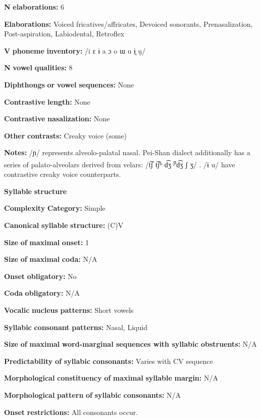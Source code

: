 \textbf{N} \textbf{elaborations:} 6

\textbf{Elaborations:} Voiced fricatives/affricates, Devoiced sonorants, Prenasalization, Post-aspiration, Labiodental, Retroflex

\textbf{V} \textbf{phoneme} \textbf{inventory:} /i ɛ ɨ a ɔ o ɯ u ɨ̰ ṵ/

\textbf{N} \textbf{vowel} \textbf{qualities:} 8

\textbf{Diphthongs} \textbf{or} \textbf{vowel} \textbf{sequences:} None

\textbf{Contrastive} \textbf{length:} None

\textbf{Contrastive} \textbf{nasalization:} None

\textbf{Other} \textbf{contrasts:} Creaky voice (some)

\textbf{Notes:} /ɲ/ represents alveolo-palatal nasal. Pei-Shan dialect additionally has a series of palato-alveolars derived from velars: /t͡ʃ t͡ʃʰ d͡ʒ \textsuperscript{ɲ}d͡ʒ ʃ ʒ/ \citep[68-9]{Maoji1997}. /ɨ u/ have contrastive creaky voice counterparts.

\textbf{Syllable} \textbf{structure}

\textbf{Complexity} \textbf{Category:} Simple

\textbf{Canonical} \textbf{syllable} \textbf{structure:} (C)V \citep[30-2]{Gerner2013}

\textbf{Size} \textbf{of} \textbf{maximal} \textbf{onset:} 1

\textbf{Size} \textbf{of} \textbf{maximal} \textbf{coda:} N/A

\textbf{Onset} \textbf{obligatory:} No

\textbf{Coda} \textbf{obligatory:} N/A

\textbf{Vocalic} \textbf{nucleus} \textbf{patterns:} Short vowels

\textbf{Syllabic} \textbf{consonant} \textbf{patterns:} Nasal, Liquid

\textbf{Size} \textbf{of} \textbf{maximal} \textbf{word{}-marginal sequences with syllabic obstruents:} N/A

\textbf{Predictability} \textbf{of} \textbf{syllabic} \textbf{consonants:} Varies with CV sequence

\textbf{Morphological} \textbf{constituency} \textbf{of} \textbf{maximal} \textbf{syllable} \textbf{margin:} N/A

\textbf{Morphological} \textbf{pattern} \textbf{of} \textbf{syllabic} \textbf{consonants:} N/A

\textbf{Onset} \textbf{restrictions:} All consonants occur.

